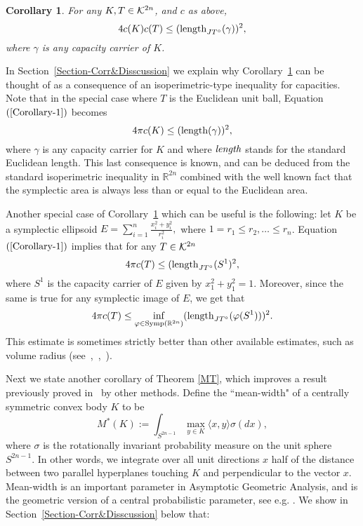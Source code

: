 \documentclass[12pt]{article}
\newtheorem{corollary}[lemma]{Corollary}
\begin{document}
\begin{corollary} \label{Iso_ineq}
For any $K,T \in {\cal K}^{2n}$, and $c$ as above,
 \begin{equation} \label{Corollary-1} 4 c(K) c(T) \le ({\rm
length}_{JT^{\circ}} (\gamma))^2, \end{equation} where $\gamma$ is
any capacity carrier of $K$.
\end{corollary}
In Section~\ref{Section-Corr&Disscussion} we explain why Corollary~\ref{Iso_ineq} can be
thought of as a consequence of an isoperimetric-type inequality for
capacities. Note that in the special case where $T$ is the Euclidean unit
ball, Equation~$(\ref{Corollary-1})$ becomes
$$ 4 \pi c(K) \leq  ({\rm length(\gamma)})^2, $$
where $\gamma$ is any capacity carrier for $K$ and where ${\it
length}$ stands for the standard Euclidean length. This last
consequence is known, and can be deduced from the standard
isoperimetric inequality in ${\mathbb R}^{2n}$ combined with the
well known fact that the symplectic area is always less than or
equal to the Euclidean area.

Another special case of Corollary~\ref{Iso_ineq} which can be useful
is the following: let $K$ be a symplectic ellipsoid ${ E}=
\sum_{i=1}^n {\frac {x_i^2 + y_i^2} {r_i^2}},$ where $1 = r_1 \leq
r_2, \ldots \leq r_n$. Equation~$(\ref{Corollary-1})$ implies that
for any $T \in {\cal K}^{2n}$
$$ 4 \pi c(T) \leq ({\rm length}_{JT^{\circ}} (S^1)^2,$$ where
$S^1$ is the  capacity carrier of ${E}$ given by $ x_1^2 + y_1^2 =
1$. Moreover, since the same is true for any symplectic image of
${E}$, we get that
\begin{equation}
 4 \pi c(T) \leq \inf_{\varphi \in {\rm Symp}({\mathbb R}^{2n})}
 ({\rm length}_{JT^{\circ}} (\varphi (S^1)))^2.
\end{equation}
This estimate is sometimes strictly better than other available
estimates, such as volume radius (see~\cite{V},~\cite{AO},~\cite{AMO}).



Next we state another corollary of Theorem \ref{MT}, which improves
 a result previously proved in~\cite{AMO} by other methods. Define
the ``mean-width" of a centrally symmetric convex body $K$ to be
 $$M^*(K) :=  \int_{S^{2n-1}} \max_{y \in K} \langle x
, y \rangle \sigma(dx),$$ where $\sigma$ is the rotationally
invariant probability measure on the unit sphere $S^{2n-1}$. In
other words, we integrate over all unit directions $x$ half of the
distance between two parallel hyperplanes touching $K$ and
perpendicular to the vector $x$. Mean-width is an important
parameter in Asymptotic Geometric Analysis, and is the geometric
version of a central probabilistic parameter, see e.g.
\cite{Pisbook}. We show in Section~\ref{Section-Corr&Disscussion}
below that:
\end{document}
